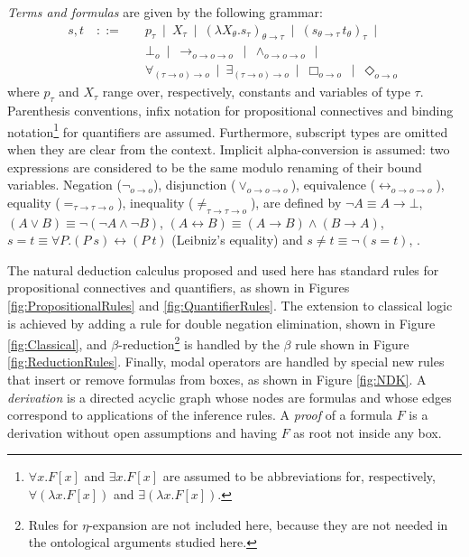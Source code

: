 \documentclass[smallextended]{svjour3}
\newcommand{\imp}{\rightarrow}
\newcommand{\biimp}{\leftrightarrow}
\newcommand{\all}{\forall}
\newcommand{\ex}{\exists}
\newcommand{\nec}{\Box} %
\newcommand{\pos}{\Diamond} %
\begin{document}
\begin{definition} \emph{Terms and formulas} are given by the following grammar:
\begin{align*}
 s,t \quad ::= \quad & 
  p_\tau \ \mid \ 
  X_\tau \ \mid \
  (\lambda X_\theta.s_\tau)_{\theta\imp\tau} \ \mid \ 
  (s_{\theta\imp\tau}\, t_\theta)_\tau \ \mid \\
& \bot_o \ \mid \
  \imp_{o\imp o\imp o} \ \mid \ 
  \wedge_{o\imp o\imp o} \ \mid \\
& \all_{(\tau\imp o)\imp o} \ \mid \ 
  \ex_{(\tau\imp o)\imp o} \ \mid \
  \nec_{o\imp o} \ \mid \
  \pos_{o\imp o}
\end{align*}
where $p_\tau$ and $X_\tau$ range over, respectively, constants and variables of type $\tau$. Parenthesis conventions, infix notation for propositional connectives and binding notation\footnote{$\forall x. F[x]$ and $\exists x. F[x]$ are assumed to be abbreviations for, respectively, $\forall (\lambda x. F[x])$ and $\exists (\lambda x. F[x])$.} for quantifiers are assumed. Furthermore, subscript types are omitted when they are clear from the context. Implicit alpha-conversion is assumed: two expressions are considered to be the same modulo renaming of their bound variables.
Negation ($\neg_{o\imp o}$), disjunction ($\vee_{o\imp o\imp o}$), equivalence ($\biimp_{o\imp o\imp o}$), equality ($=_{\tau\imp\tau\imp o}$), inequality ($\neq_{\tau\imp\tau\imp o}$), are defined by $\neg A\equiv A\imp \bot$, $(A \vee B) \equiv \neg (\neg A \wedge \neg B)$, $ (A\biimp B)\equiv (A\imp B)\wedge (B\imp A)$, $s = t \equiv \forall P. (P \ s) \biimp (P \ t)$ (Leibniz's equality) and $s \neq t\equiv \neg (s=t)$, .
\end{definition}

The natural deduction calculus proposed and used here has standard rules for propositional connectives and quantifiers, as shown in Figures \ref{fig:PropositionalRules} and \ref{fig:QuantifierRules}. The extension to classical logic is achieved by adding a rule for double negation elimination, shown in Figure \ref{fig:Classical}, and $\beta$-reduction\footnote{Rules for $\eta$-expansion \citep{BenzmuellerBrownKohlhase} are not included here, because they are not needed in the ontological arguments studied here.} is handled by the $\beta$ rule shown in Figure \ref{fig:ReductionRules}.
Finally, modal operators are handled by special new rules that insert or remove formulas from boxes, as shown in Figure \ref{fig:NDK}.
A \emph{derivation} is a directed acyclic graph whose nodes are formulas and whose edges correspond to applications of the inference rules. A \emph{proof} of a formula $F$ is a derivation without open assumptions and having $F$ as root not inside any box. 
\end{document}

